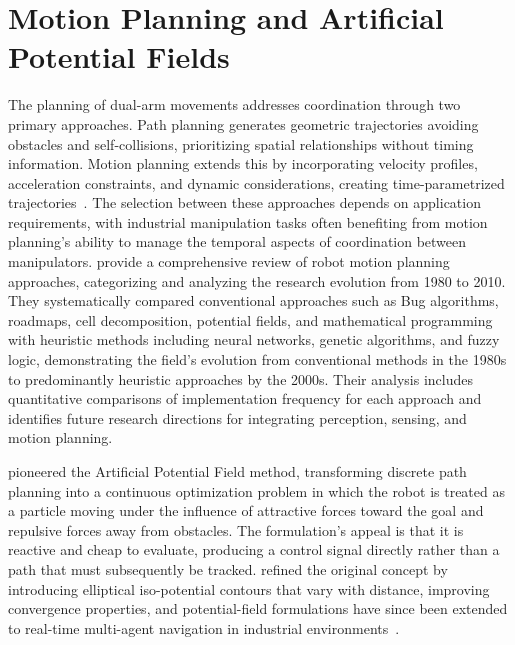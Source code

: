 \section{Motion Planning and Artificial Potential Fields}\label{sec:lit_planning}

The planning of dual-arm movements addresses coordination through two primary approaches. Path
planning generates geometric trajectories avoiding obstacles and self-collisions, prioritizing
spatial relationships without timing information. Motion planning extends this by incorporating
velocity profiles, acceleration constraints, and dynamic considerations, creating time-parametrized
trajectories~\citep{abbas2023systematic}. The selection between these approaches depends on
application requirements, with industrial manipulation tasks often benefiting from motion planning's
ability to manage the temporal aspects of coordination between manipulators. \citet{tang2012review} provide a comprehensive review of robot motion planning approaches, categorizing and analyzing the research evolution from 1980 to 2010. They systematically compared conventional approaches such as Bug algorithms, roadmaps, cell decomposition, potential fields, and mathematical programming with heuristic methods including neural networks, genetic algorithms, and fuzzy logic, demonstrating the field's evolution from conventional methods in the 1980s to predominantly heuristic approaches by the 2000s. Their analysis includes quantitative comparisons of implementation frequency for each approach and identifies future research directions for integrating perception, sensing, and motion planning.

\citet{khatib1986real} pioneered the Artificial Potential Field method, transforming discrete path
planning into a continuous optimization problem in which the robot is treated as a particle moving
under the influence of attractive forces toward the goal and repulsive forces away from obstacles.
The formulation's appeal is that it is reactive and cheap to evaluate, producing a control signal
directly rather than a path that must subsequently be tracked. \citet{volpe1987artificial} refined
the original concept by introducing elliptical iso-potential contours that vary with distance,
improving convergence properties, and potential-field formulations have since been extended to
real-time multi-agent navigation in industrial environments~\citep{prajapati2026mppf}.

